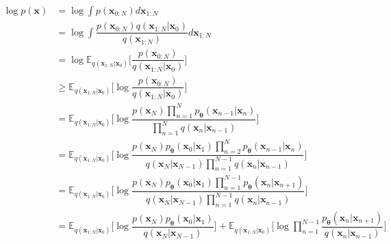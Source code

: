 \documentclass[14pt, a4paper]{article}
\numberwithin{equation}{section}
\numberwithin{figure}{section}
\numberwithin{dl}{section}
\numberwithin{md}{section}
\numberwithin{bd}{section}
\numberwithin{dn}{section}
\numberwithin{hq}{section}
\begin{document}
    \begin{equation*} \label{eq:ELBO-First-Derivation}
        \begin{aligned}
            \log p(\boldsymbol{x}) &= \log \int p(\boldsymbol{x}_{0:N}) d \boldsymbol{x}_{1:N} \\
            &= \log \int \dfrac{p(\boldsymbol{x}_{0:N}) q(\boldsymbol{x}_{1:N} \vert \boldsymbol{x}_0)}{q(\boldsymbol{x}_{1:N})} d \boldsymbol{x}_{1:N} \\
            &= \log \mathbb{E}_{q(\boldsymbol{x}_{1:N} \vert \boldsymbol{x}_0)} \Bigg \lbrack \dfrac{p(\boldsymbol{x}_{0:N})}{q(\boldsymbol{x}_{1:N} \vert \boldsymbol{x}_0)} \Bigg \rbrack \\
            &\geq \mathbb{E}_{q(\boldsymbol{x}_{1:N} \vert \boldsymbol{x}_0)} \Bigg \lbrack \log \dfrac{p(\boldsymbol{x}_{0:N})}{q(\boldsymbol{x}_{1:N} \vert \boldsymbol{x}_0)} \Bigg \rbrack \\
            &= \mathbb{E}_{q(\boldsymbol{x}_{1:N} \vert \boldsymbol{x}_0)} \Bigg \lbrack \log \dfrac{p(\boldsymbol{x}_N) \prod_{n=1}^N p_{\boldsymbol{\theta}} (\boldsymbol{x}_{n-1} \vert \boldsymbol{x}_n)}{\prod_{n=1}^N q(\boldsymbol{x}_n \vert \boldsymbol{x}_{n-1})} \Bigg \rbrack \\
            &= \mathbb{E}_{q(\boldsymbol{x}_{1:N} \vert \boldsymbol{x}_0)} \Bigg \lbrack \log \dfrac{p(\boldsymbol{x}_N) p_{\boldsymbol{\theta}} (\boldsymbol{x}_0 \vert \boldsymbol{x}_1) \prod_{n=2}^{N} p_{\boldsymbol{\theta}} (\boldsymbol{x}_{n-1} \vert \boldsymbol{x}_n)}{q(\boldsymbol{x}_N \vert \boldsymbol{x}_{N-1})\prod_{n=1}^{N-1} q(\boldsymbol{x}_n \vert \boldsymbol{x}_{n-1})} \Bigg \rbrack \\
            &= \mathbb{E}_{q(\boldsymbol{x}_{1:N} \vert \boldsymbol{x}_0)} \Bigg \lbrack \log \dfrac{p(\boldsymbol{x}_N) p_{\boldsymbol{\theta}} (\boldsymbol{x}_0 \vert \boldsymbol{x}_1) \prod_{n=1}^{N-1} p_{\boldsymbol{\theta}} (\boldsymbol{x}_{n} \vert \boldsymbol{x}_{n+1})}{q(\boldsymbol{x}_N \vert \boldsymbol{x}_{N-1})\prod_{n=1}^{N-1} q(\boldsymbol{x}_n \vert \boldsymbol{x}_{n-1})} \Bigg \rbrack \\
            &= \mathbb{E}_{q(\boldsymbol{x}_{1:N} \vert \boldsymbol{x}_0)} \Bigg \lbrack \log \dfrac{p(\boldsymbol{x}_N) p_{\boldsymbol{\theta}} (\boldsymbol{x}_0 \vert \boldsymbol{x}_1)}{q(\boldsymbol{x}_N \vert \boldsymbol{x}_{N-1})} \Bigg \rbrack + \mathbb{E}_{q(\boldsymbol{x}_{1:N} \vert \boldsymbol{x}_0)} \Bigg \lbrack \log \prod_{n=1}^{N-1} \dfrac{p_{\boldsymbol{\theta}} (\boldsymbol{x}_{n} \vert \boldsymbol{x}_{n+1})}{q(\boldsymbol{x}_n \vert \boldsymbol{x}_{n-1})} \Bigg \rbrack \\

\end{aligned}
\end{equation*}
\end{document}
